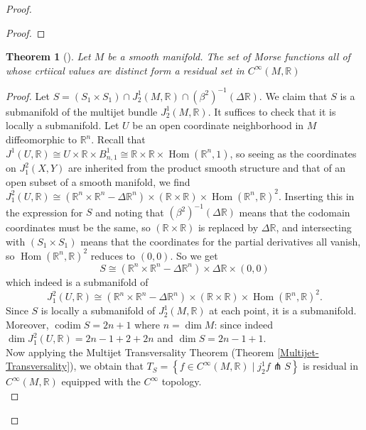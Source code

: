 \documentclass[reqno]{amsart}
\newtheorem{theorem}{Theorem}[section]
\theoremstyle{definition}
\theoremstyle{remark}
\DeclareMathOperator{\Hom}{Hom}
\DeclareMathOperator{\codim}{codim}
\begin{document}
\begin{proof}
\begin{proof}
 \end{proof}

 \begin{theorem}[]
     Let $M$ be a smooth manifold.
     The set of Morse functions all of whose
     crtiical values are distinct form a residual set
     in $C^{\infty}(M, \mathbb{R})$
 \end{theorem}

 \begin{proof}
     Let
     $S = \left( S_1 \times S_1 \right) \cap
     J_2^{1}(M,\mathbb{R}) \cap
     \left( \beta^2 \right)^{-1}
     \left( \Delta \mathbb{R} \right) $.
     We claim that $S$ is a submanifold of the
     multijet bundle
     $J_2^{1}(M,\mathbb{R})$.
     It suffices to check that it is locally
     a submanifold.
     Let $U$ be an open coordinate
     neighborhood in $M$ diffeomorphic to
     $\mathbb{R}^{n}$. Recall that
     $J^{1}(U,\mathbb{R}) \cong
     U \times \mathbb{R} \times B_{n,1}^{1}
     \cong \mathbb{R} \times \mathbb{R} \times
     \Hom \left( \mathbb{R}^{n},1 \right) $, so
     seeing as the coordinates on
     $J_1^2 (X,Y)$ are inherited from the product smooth
     structure and that of an open subset of a smooth
     manifold, we find
     $J_1^2(U, \mathbb{R}) \cong
     \left( \mathbb{R}^{n} \times \mathbb{R}^{n}
     - \Delta\mathbb{R}^{n} \right) \times
     \left( \mathbb{R} \times \mathbb{R} \right)
     \times \Hom\left(\mathbb{R}^{n},\mathbb{R}  \right)^2 $.
     Inserting this in the expression for
     $S$ and noting that
     $\left( \beta^2 \right)^{-1}
     \left( \Delta \mathbb{R} \right) $ means
     that the codomain coordinates must be the same,
     so $\left( \mathbb{R} \times \mathbb{R} \right) $ is
     replaced by $\Delta \mathbb{R}$, and
     intersecting with $\left( S_1 \times S_1 \right) $ means
     that the coordinates for the
     partial derivatives all vanish, so
     $\Hom \left( \mathbb{R}^{n},\mathbb{R} \right)^2$ reduces
     to $\left( 0,0 \right) $. So we get
     \[
     S \cong \left( \mathbb{R}^{n} \times \mathbb{R}^{n}
     - \Delta \mathbb{R}^{n} \right) \times
     \Delta \mathbb{R} \times \left( 0,0 \right)
     \]
     which indeed is a submanifold of
     \[
         J_1^2 \left( U, \mathbb{R} \right)
         \cong
         \left( \mathbb{R}^{n} \times \mathbb{R}^{n}
         - \Delta \mathbb{R}^{n} \right) \times
         \left( \mathbb{R} \times \mathbb{R} \right)
         \times \Hom \left( \mathbb{R}^{n},\mathbb{R} \right)^2.
     \]
     Since $S$ is locally a submanifold of
     $J_2^{1}(M,\mathbb{R})$ at each point, it is a submanifold.
     Moreover,
     $\codim S = 2n+1$ where $n = \dim M$: since indeed
     $\dim J_1^2 \left( U,\mathbb{R} \right)
     = 2n - 1 + 2 + 2n$ and
     $\dim S = 2n-1 + 1$.\\
     Now applying the Multijet Transversality Theorem
 (Theorem \ref{Multijet-Transversality}), we obtain that
  $T_{S} =
  \left\{ f \in C^{\infty}(M, \mathbb{R}) \mid
  j_2^{1} f \pitchfork S \right\} $ is
  residual in
  $C^{\infty}(M, \mathbb{R})$ equipped with the
  $C^{\infty}$ topology.\\



\end{proof}
\end{proof}
\end{document}
